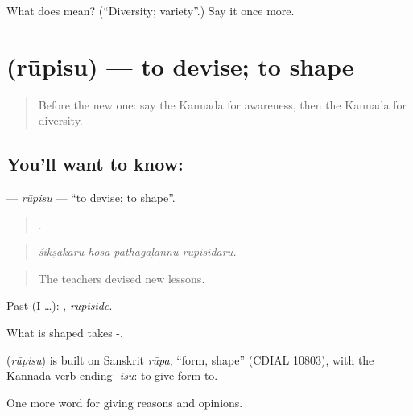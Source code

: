 \begin{tcolorbox}[breakable,colback=teal!4,colframe=teal!35!black,title={Before you move on}]
What does  mean? (\textquotedblleft{}Diversity; variety\textquotedblright{}.) Say it once more.
\end{tcolorbox}
\section[\texorpdfstring{\kn{ರೂಪಿಸು} (rūpisu)}{ರೂಪಿಸು (rūpisu)}]{ (rūpisu) — to devise; to shape}

\label{lesson:KA-C403-rupisu}



\begin{quote}
Before the new one: say the Kannada for awareness, then the Kannada for diversity.
\end{quote}

\subsection*{You'll want to know: }
\textbf{} — \emph{rūpisu} — \textquotedblleft{}to devise; to shape\textquotedblright{}.

\begin{quote}
   .
\end{quote}

\begin{quote}
\emph{śikṣakaru hosa pāṭhagaḷannu rūpisidaru.}
\end{quote}

\begin{quote}
The teachers devised new lessons.
\end{quote}

Past (I …): , \emph{rūpiside}.

What is shaped takes -.

\begin{cousinweb}
\textbf{} (\emph{rūpisu}) is built on Sanskrit \emph{rūpa}, \textquotedblleft{}form, shape\textquotedblright{} (CDIAL 10803), with the Kannada verb ending -\emph{isu}: to give form to.
\end{cousinweb}

\begin{grammarlens}[title={What you've built}]
One more word for giving reasons and opinions.
\end{grammarlens}

